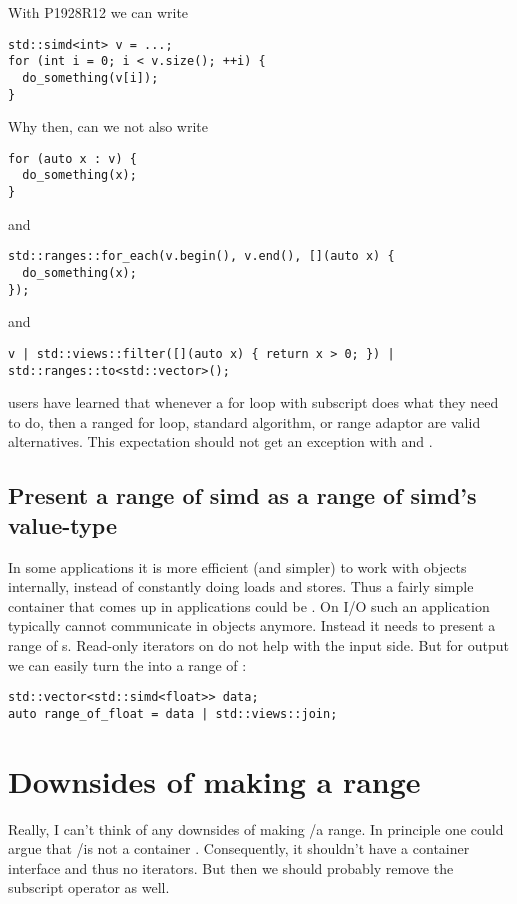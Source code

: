 With P1928R12 we can write
\medskip\begin{lstlisting}
std::simd<int> v = ...;
for (int i = 0; i < v.size(); ++i) {
  do_something(v[i]);
}
\end{lstlisting}

Why then, can we not also write
\medskip\begin{lstlisting}
for (auto x : v) {
  do_something(x);
}
\end{lstlisting}
and
\medskip\begin{lstlisting}
std::ranges::for_each(v.begin(), v.end(), [](auto x) {
  do_something(x);
});
\end{lstlisting}
and
\medskip\begin{lstlisting}
v | std::views::filter([](auto x) { return x > 0; }) | std::ranges::to<std::vector>();
\end{lstlisting}

\CC{} users have learned that whenever a for loop with subscript does what they need to do, then a
ranged for loop, standard algorithm, or range adaptor are valid alternatives.
This expectation should not get an exception with \simd and \mask.

\subsection{Present a range of simd as a range of simd's value-type}

In some applications it is more efficient (and simpler) to work with \simd objects internally,
instead of constantly doing loads and stores.
Thus a fairly simple container that comes up in applications could be
.
On I/O such an application typically cannot communicate in \simd objects anymore.
Instead it needs to present a range of s.
Read-only iterators on \simd do not help with the input side.
But for output we can easily turn the  into a range of :
\medskip\begin{lstlisting}
std::vector<std::simd<float>> data;
auto range_of_float = data | std::views::join;
\end{lstlisting}

\section{Downsides of making  a range}

Really, I can't think of any downsides of making \simd/\mask a range.
In principle one could argue that \simd/\mask is not a container \cite{P0851R0}.
Consequently, it shouldn't have a container interface and thus no iterators.
But then we should probably remove the subscript operator as well.

